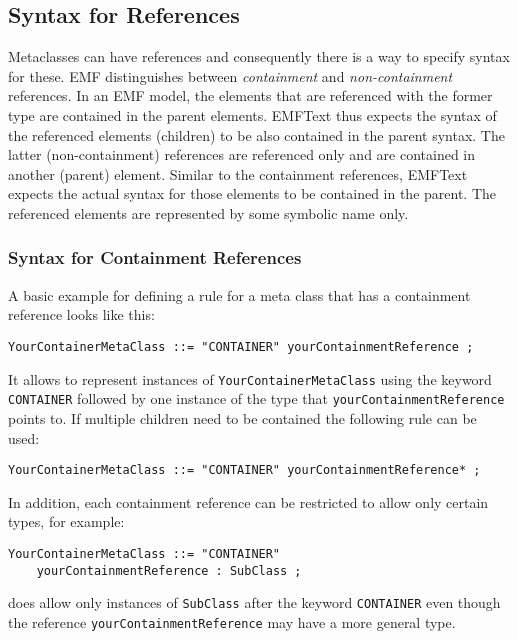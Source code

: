 \subsection{Syntax for References}

Metaclasses can have references and consequently there is a way to specify 
syntax for these. EMF distinguishes between \emph{containment} and
\emph{non-containment} references. In an EMF model, the elements that are
referenced with the former type are contained in the parent elements. EMFText
thus expects the syntax of the referenced elements (children) to be also 
contained in the parent syntax. The latter (non-containment) references are
referenced only and are contained in another (parent) element. Similar to 
the containment references, EMFText expects the actual syntax for those elements
to be contained in the parent. The referenced elements are represented by 
some symbolic name only.

\subsubsection{Syntax for Containment References}

A basic example for defining a rule for a meta class that has a containment 
reference looks like this:

\begin{lstlisting}
YourContainerMetaClass ::= "CONTAINER" yourContainmentReference ;
\end{lstlisting}

It allows to represent instances of \texttt{YourContainerMetaClass} using the
keyword \texttt{CONTAINER} followed by one instance of the type that
\texttt{yourContainmentReference} points to. If multiple children need to be
contained the following rule can be used:

\begin{lstlisting}
YourContainerMetaClass ::= "CONTAINER" yourContainmentReference* ;
\end{lstlisting}

In addition, each containment reference can be restricted to allow only certain 
types, for example:

\begin{lstlisting}
YourContainerMetaClass ::= "CONTAINER" 
    yourContainmentReference : SubClass ;
\end{lstlisting}

does allow only instances of \texttt{SubClass} after the keyword
\texttt{CONTAINER} even though the reference \texttt{yourContainmentReference}
may have a more general type.

